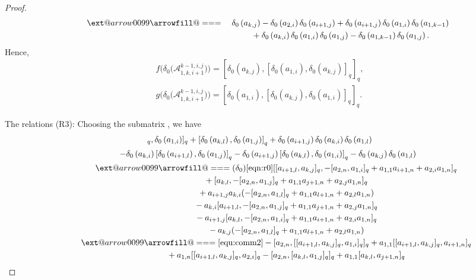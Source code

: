 \documentclass[10pt,a4paper]{amsart}
\makeatletter
\def\x@arrow{\DOTSB\Relbar}
\def\xlongequalsignfill@{\arrowfill@\x@arrow\Relbar\x@arrow}
\providecommand{\xlongequal}[2][]{%
	\ext@arrow 0099\xlongequalsignfill@{#1}{#2}}
\numberwithin{equation}{section}
\def\lr#1{\left[#1\right]}
\def\lrb#1{\left(#1\right)}
\def\d{\delta}
\def\A{\mathscr{A}}
\makeatother
\begin{document}
\begin{proof}
\begin{gather*}
 \qquad\xlongequal{\quad} \d_0\lrb{a_{k,j}}-\d_0\lrb{a_{2,i}}\d_0\lrb{a_{i+1,j}} +\d_0\lrb{a_{i+1,j}}\d_0\lrb{a_{1,i}}\d_0\lrb{a_{1,k-1}}\\
 \phantom{ \qquad\xlongequal{\quad}}{} +\d_0\lrb{a_{k,i}}\d_0\lrb{a_{1,i}}\d_0\lrb{a_{1,j}} -\d_0\lrb{a_{1,k-1}}\d_0\lrb{a_{1,j}}.
\end{gather*}
Hence,
\begin{gather*}
f\bigl(\d_0\bigl(\A_{1,k,i+1}^{k-1,i,j}\bigr)\bigr)= [\d_0\lrb{a_{k, j}}, {\lr{\d_0\lrb{a_{1, i}}, \d_0\lrb{a_{k, j}}}}_q]_q,\\
 g\bigl(\d_0\bigl(\A_{1,k,i+1}^{k-1,i,j}\bigr)\bigr)=[\d_0\lrb{a_{1, i}}, {\lr{\d_0\lrb{a_{k, j}}, \d_0\lrb{ a_{1,i}}}}_q]_q.
\end{gather*}

The relations (R3):
Choosing the submatrix \smash{$\A_{1,k,i+1}^{i,j,l}(l\neq n)$}, we have
 \begin{gather*}
 [\lr{\d_0\lrb{a_{i+1,l}}, \d_0\lrb{a_{k,j}}}_q, \d_0\lrb{a_{1,i}}]_q+ \lr{\d_0\lrb{a_{k,l}}, \d_0\lrb{a_{1,j}}}_q +\d_0\lrb{a_{i+1,j}}\d_0\lrb{a_{k,i}} \d_0\lrb{a_{1,l}} \\
\qquad -\d_0\lrb{a_{k,i}}\lr{\d_0\lrb{a_{i+1,l}}, \d_0\lrb{a_{1,j}}}_q -\d_0\lrb{a_{i+1,j}}\lr{\d_0\lrb{a_{k,l}}, \d_0\lrb{a_{1,i}}}_q -\d_0\lrb{a_{k,j}} \d_0\lrb{a_{1,l}}\\
\qquad\qquad\xlongequal[(\d_0)]{\eqref{eqn:r0}} [ [a_{i+1,l}, a_{k,j} ]_q, - [a_{2,n},a_{1,i} ]_q+a_{1,1}a_{i+1,n}+a_{2,i}a_{1,n} ]_q\\
\phantom{\qquad\qquad\qquad\ }{} + [a_{k,l}, - [a_{2,n},a_{1,j} ]_q+a_{1,1}a_{j+1,n}+a_{2,j}a_{1,n} ]_q\\
\phantom{\qquad\qquad\qquad\ }{} +a_{i+1,j}a_{k,i} (- [a_{2,n},a_{1,l} ]_q+a_{1,1}a_{l+1,n}+a_{2,l}a_{1,n} ) \\
\phantom{\qquad\qquad\qquad\ }{} -a_{k,i} [a_{i+1,l}, - [a_{2,n},a_{1,j} ]_q+a_{1,1}a_{j+1,n}+a_{2,j}a_{1,n} ]_q \\
\phantom{\qquad\qquad\qquad\ }{}-a_{i+1,j} [a_{k,l},- [a_{2,n},a_{1,i} ]_q+a_{1,1}a_{i+1,n}+a_{2,i}a_{1,n} ]_q \\
\phantom{\qquad\qquad\qquad\ }{} -a_{k,j} (- [a_{2,n},a_{1,l} ]_q+a_{1,1}a_{l+1,n}+a_{2,l}a_{1,n} )\\
\qquad\qquad \xlongequal{\eqref{equ:comm2}} - [a_{2,n}, [ [a_{i+1,l}, a_{k,j} ]_q,a_{1,i} ]_q ]_q +a_{1,1} [ [a_{i+1,l}, a_{k,j} ]_q, a_{i+1,n} ]_q \\
 \phantom{\qquad\qquad \qquad\ }{} +a_{1,n} [ [a_{i+1,l}, a_{k,j} ]_q, a_{2,i} ]_q - [a_{2,n}, [a_{k,l},a_{1,j} ]_q ]_q +a_{1,1} [a_{k,l},a_{j+1,n} ]_q\\

\end{gather*}
\end{proof}
\end{document}
